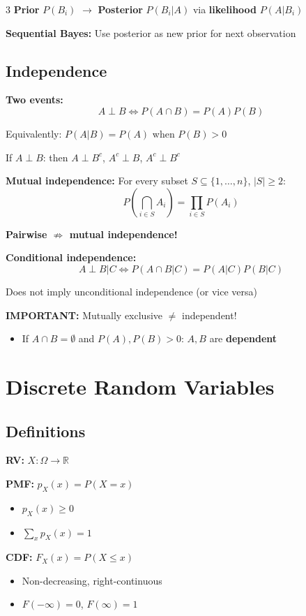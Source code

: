 \documentclass[10pt,landscape]{article}
\begin{document}
\begin{multicols}{3}
\textbf{Prior} $P(B_i)$ $\to$ \textbf{Posterior} $P(B_i|A)$ via \textbf{likelihood} $P(A|B_i)$

\textbf{Sequential Bayes:} Use posterior as new prior for next observation

\subsection{Independence}

\textbf{Two events:}
$$A \perp B \Leftrightarrow P(A \cap B) = P(A)P(B)$$

Equivalently: $P(A|B) = P(A)$ when $P(B) > 0$

If $A \perp B$: then $A \perp B^c$, $A^c \perp B$, $A^c \perp B^c$

\textbf{Mutual independence:} For every subset $S \subseteq \{1, \ldots, n\}$, $|S| \geq 2$:
$$P(\bigcap_{i \in S} A_i) = \prod_{i \in S} P(A_i)$$

\textbf{Pairwise $\not\Rightarrow$ mutual independence!}

\textbf{Conditional independence:}
$$A \perp B | C \Leftrightarrow P(A \cap B | C) = P(A|C)P(B|C)$$

Does not imply unconditional independence (or vice versa)

\textbf{IMPORTANT:} Mutually exclusive $\neq$ independent!
\begin{itemize}[leftmargin=*,noitemsep]
\item If $A \cap B = \emptyset$ and $P(A), P(B) > 0$: $A, B$ are \textbf{dependent}
\end{itemize}

\section{Discrete Random Variables}

\subsection{Definitions}
\textbf{RV:} $X: \Omega \to \mathbb{R}$

\textbf{PMF:} $p_X(x) = P(X = x)$
\begin{itemize}[leftmargin=*,noitemsep]
\item $p_X(x) \geq 0$
\item $\sum_x p_X(x) = 1$
\end{itemize}

\textbf{CDF:} $F_X(x) = P(X \leq x)$
\begin{itemize}[leftmargin=*,noitemsep]
\item Non-decreasing, right-continuous
\item $F(-\infty) = 0$, $F(\infty) = 1$
\end{itemize}


\end{multicols}
\end{document}
